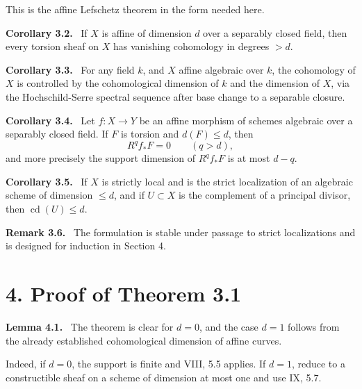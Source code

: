 \documentclass[12pt]{article}
\newenvironment{statement}[1]{\par\medskip\noindent\textbf{#1.}\ }{\par\medskip}
\newenvironment{remarktext}[1]{\par\medskip\noindent\textbf{#1.}\ }{\par\medskip}
\begin{document}
This is the affine Lefschetz theorem in the form needed here.

\begin{statement}{Corollary 3.2}
If \(X\) is affine of dimension \(d\) over a separably closed field, then every torsion sheaf on \(X\) has vanishing cohomology in degrees \(>d\).
\end{statement}

\begin{statement}{Corollary 3.3}
For any field \(k\), and \(X\) affine algebraic over \(k\), the cohomology of \(X\) is controlled by the cohomological dimension of \(k\) and the dimension of \(X\), via the Hochschild-Serre spectral sequence after base change to a separable closure.
\end{statement}

\begin{statement}{Corollary 3.4}
Let \(f:X\to Y\) be an affine morphism of schemes algebraic over a separably closed field. If \(F\) is torsion and \(d(F)\le d\), then
\[
R^qf_*F=0\qquad(q>d),
\]
and more precisely the support dimension of \(R^qf_*F\) is at most \(d-q\).
\end{statement}

\begin{statement}{Corollary 3.5}
If \(X\) is strictly local and is the strict localization of an algebraic scheme of dimension \(\le d\), and if \(U\subset X\) is the complement of a principal divisor, then \(\operatorname{cd}(U)\le d\).
\end{statement}

\begin{remarktext}{Remark 3.6}
The formulation is stable under passage to strict localizations and is designed for induction in Section 4.
\end{remarktext}

\section*{4. Proof of Theorem 3.1}

\begin{statement}{Lemma 4.1}
The theorem is clear for \(d=0\), and the case \(d=1\) follows from the already established cohomological dimension of affine curves.
\end{statement}

Indeed, if \(d=0\), the support is finite and VIII, 5.5 applies. If \(d=1\), reduce to a constructible sheaf on a scheme of dimension at most one and use IX, 5.7.
\end{document}
